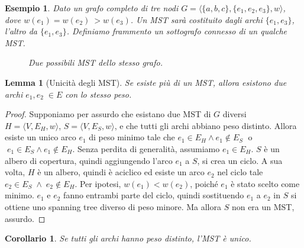 \documentclass[target=bach,aauheader=,style=]{thud}
\newcommand{\eng}[1]{\foreignlanguage{english}{#1}}
\newtheorem{lemma}{Lemma}
\newtheorem{corollary}{Corollario}[lemma]
\newtheorem*{exmp}{Esempio}
\begin{document}
\begin{exmp}
Dato un grafo completo di tre nodi $G=\langle\{a,b,c\},\{e_1,e_2,e_3\},w\rangle$, dove $w(e_1)=w(e_2)\:>w(e_3)$. Un MST sarà costituito dagli archi $\{e_1, e_3\}$, l'altro da $\{e_1, e_3\}$. Definiamo \emph{frammento} un sottografo connesso di un qualche MST.
\begin{figure}[H]
    \centering
    \hspace{2cm}
    \caption{Due possibili MST dello stesso grafo.}
\end{figure}
\end{exmp}
\begin{lemma}[Unicità degli MST]\label{mst:uniqueness}
Se esiste più di un MST, allora esistono due archi $e_1,e_2\;\in E$ con lo stesso peso.
\end{lemma}
\begin{proof}
Supponiamo per assurdo che esistano due MST di $G$ diversi $H=\langle V,E_H,w\rangle$, $S=\langle V,E_S,w\rangle$, e che tutti gli archi abbiano peso distinto. Allora esiste un unico arco $e_1$ di peso minimo tale che $e_1\in E_H\land e_1\notin E_S\;$ o $\;e_1\in E_S\land e_1\notin E_H$. Senza perdita di generalità, assumiamo $e_1\in E_H$. $S$ è un albero di copertura, quindi aggiungendo l'arco $e_1$ a $S$, si crea un ciclo. A sua volta, $H$ è un albero, quindi è aciclico ed esiste un arco $e_2$ nel ciclo tale $e_2\in E_S\;\land\;e_2\notin E_H$. Per ipotesi, $w(e_1)<w(e_2)$, poiché $e_1$ è stato scelto come minimo. $e_1$ e $e_2$ fanno entrambi parte del ciclo, quindi sostituendo $e_1$ a $e_2$ in $S$ si ottiene uno \eng{spanning tree} diverso di peso minore. Ma allora $S$ non era un MST, assurdo.
\end{proof}
\begin{corollary}
Se tutti gli archi hanno peso distinto, l'MST è unico.
\end{corollary}
\end{document}
